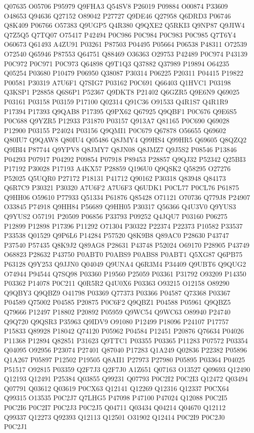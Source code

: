 Q07635
O05706
P95979
Q9FHA3
Q54SV8
P26019
P09884
O00874
P33609
O48653
Q94636
Q27152
O89042
P27727
Q9DE46
Q27958
Q6DRD3
P06746
Q8K409
P06766
O57383
Q9UGP5
Q4R380
Q9QXE2
Q5RKI3
Q9NP87
Q9JIW4
Q7Z5Q5
Q7TQ07
O75417
P42494
P0C986
P0C984
P0C983
P0C985
Q7T6Y4
O60673
Q61493
A4ZU91
P03261
P87503
P04495
P05664
P06538
P48311
O72539
O72540
Q65946
P87553
Q64751
Q88469
O36363
O29753
P42489
P0C974
P43139
P0C972
P0C971
P0C973
Q64898
Q9T1Q3
Q37882
Q37989
P19894
O64235
Q05254
P03680
P10479
P06950
Q38087
P30314
P06225
P20311
P04415
P19822
P00581
P30319
A7U6F1
Q7SIG7
P03162
P0C691
Q66403
Q1HVC1
P03198
Q3KSP1
P28858
Q6S6P1
P52367
Q9DKT8
P21402
Q6GZR5
Q9E6N9
Q69025
P03161
P03158
P03159
P17100
Q02314
Q91C36
O91533
Q4R1S7
Q4R1R9
P17394
P17393
Q9QAB8
P17395
Q9PX62
Q67925
Q9QBF1
P0C676
Q9E6S5
P0C688
Q9YZR5
P12933
P31870
P03157
Q913A7
Q81165
P0C690
Q69028
P12900
P03155
P24024
P03156
Q9QMI1
P0C679
Q67878
O56655
Q69602
Q80IU7
Q9QAW8
Q80IU4
Q05486
Q8JMY4
Q99HS4
Q99HR5
Q69605
Q8QZQ2
Q9IBI4
P87744
Q9YPV8
Q8JMY7
Q8JN08
Q8JMZ7
Q9J5S2
P08546
P13846
P04293
P07917
P04292
P09854
P07918
P89453
P28857
Q9QJ32
P52342
Q25BI3
P17192
P30028
P17193
A4KX57
P28859
Q196U0
Q9QSK2
Q58295
O27276
P52025
Q5UQR0
P27172
P18131
P41712
Q90162
P30318
Q83948
Q84173
Q6R7C9
P30321
P30320
A7U6F2
A7U6F3
Q6UDK1
P0CL77
P0CL76
P61875
Q9HH06
O59610
P77933
Q51334
P61876
Q85428
O71121
O70736
Q779J8
P24907
O33845
P74918
Q9HH84
P56689
Q9HH05
P30317
Q56366
Q4U3V0
Q9YUS3
Q9YUS2
O57191
P20509
P06856
P33793
P09252
Q4JQU7
P03160
P06275
P12899
P12898
P17396
P11292
O71304
P30322
P22374
P22373
P10582
P33537
P33538
Q01529
Q9P6L6
P14284
P57520
Q8K9B8
Q89AC0
P28630
P43747
P37540
P57435
Q8K9J2
Q89AG8
P28631
P43748
P52024
O69170
P28905
P43749
O68823
P28632
P43750
P0ABT0
P0ABS9
P0ABS8
P0ABT1
Q5XG87
Q6PB75
P63128
Q9Y253
Q9JJN0
Q04049
Q9UNA4
Q6R3M4
P34409
Q9UBT6
Q9QUG2
O74944
P94544
Q7SQ98
P03360
P19560
P25059
P03361
P31792
O93209
P14350
P03362
P14078
P0C211
Q0R5R2
Q4U0X6
P03363
O93215
O12158
O89290
Q9QBY3
Q9QBZ9
O41798
P03369
Q77373
P03366
P04587
Q73368
P03367
P04589
Q75002
P04585
P20875
P0C6F2
Q9QBZ1
P04588
P05961
Q9QBZ5
Q79666
P12497
P18802
P20892
P05959
Q9WC54
Q9WC63
O89940
P24740
Q9Q720
Q9QSR3
P35963
Q9IDV9
O91080
P12499
P18096
P24107
P17757
P15833
Q89928
P18042
Q74120
P05962
P04584
P12451
P20876
Q76634
P04026
P11368
P12894
Q82851
P31623
Q9TTC1
P03355
P03365
P11283
P07572
P03354
Q04095
O92956
P23074
P27401
Q87040
P17283
Q1A249
Q02836
P22382
P05896
Q1A267
P05897
P12502
P19505
Q8AII1
P27973
P27980
P05895
P03364
P04025
P51517
O92815
P03359
Q2F7J3
Q2F7J0
A1Z651
Q07163
O13527
Q09693
Q12490
Q12193
Q12491
P25384
Q03855
Q99231
Q07793
P0C2I2
P0C2I3
Q12472
Q03494
Q07791
Q03612
Q03619
P0CX63
Q12141
Q12269
Q12316
Q12337
P0CX64
Q99315
O13535
P0C2J7
Q7LHG5
P47098
P47100
P47024
Q12088
P0C2I5
P0C2I6
P0C2I7
P0C2J3
P0C2J5
Q04711
Q03434
Q04214
Q04670
Q12112
Q99337
Q12273
Q92393
Q12113
Q12501
O31902
Q12414
P0C2I9
P0C2J0
P0C2J1

